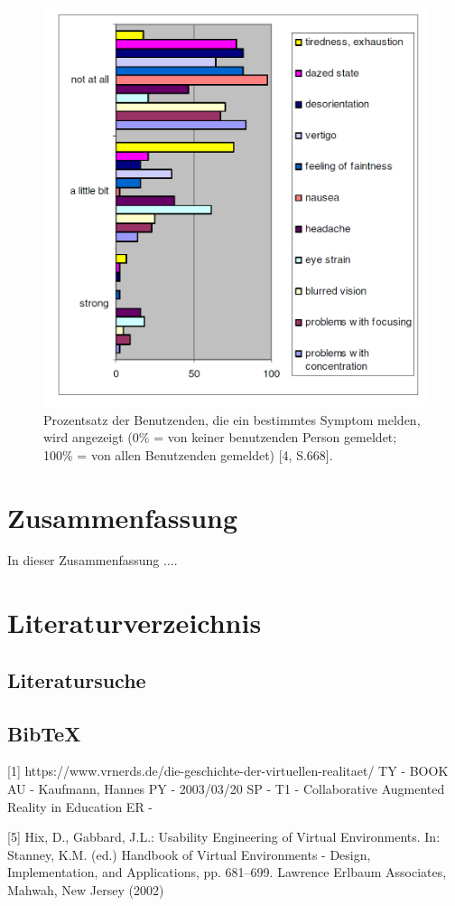 \documentclass[deutsch]{llncs}
\begin{document}
\begin{figure}
\begin{center}
\includegraphics[scale=0.5]{Bilder/Sickness.PNG}
\caption{Prozentsatz der Benutzenden, die ein bestimmtes Symptom melden, wird angezeigt (0\% = von keiner benutzenden Person gemeldet; 100\% = von allen Benutzenden gemeldet) [4, S.668].}
\label{Sickness}
\end{center}
\end{figure}

\section{Zusammenfassung}
\label{sec:typo}
In dieser Zusammenfassung .... 

\section{Literaturverzeichnis}
\label{sec:bib}

\subsection{Literatursuche}
\label{subsec:search}


\subsection{BibTeX}
\label{subsec:bibtex}
[1] https://www.vrnerds.de/die-geschichte-der-virtuellen-realitaet/
\cite{2 http://virtualrealityforeducation.com/wp-content/uploads/2018/06/HuAu_Lee_2017_VRinEd.pdf}
TY  - BOOK
AU  - Kaufmann, Hannes
PY  - 2003/03/20
SP  - 
T1  - Collaborative Augmented Reality in Education
ER  - 
\printbibliography

[5] Hix, D., Gabbard, J.L.: Usability Engineering of Virtual Environments. In: Stanney, K.M.
(ed.) Handbook of Virtual Environments - Design, Implementation, and Applications, pp.
681–699. Lawrence Erlbaum Associates, Mahwah, New Jersey (2002)
\end{document}
